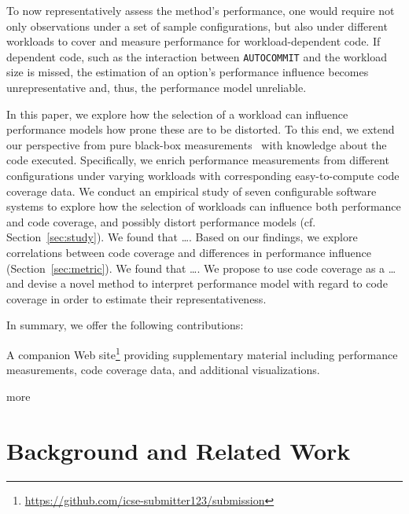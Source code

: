 To now representatively assess the method's performance, one would require not only observations under a set of sample configurations, but also under different workloads to cover and measure performance for workload-dependent code. If dependent code, such as the interaction between \texttt{AUTOCOMMIT} and the workload size is missed, the estimation of an option's performance influence becomes unrepresentative and, thus, the performance model unreliable.

In this paper, we explore how the selection of a workload can influence performance models how prone these are to be distorted. To this end, we extend our perspective from pure black-box measurements~\cite{dorn2020,siegmundPerformanceinfluenceModelsHighly2015,haDeepPerf2019,perfAL,guoVariabilityawarePerformancePrediction2013,sarkarCostEfficientSamplingPerformance,guo_2018_data,fourier_learning_2015,perLasso} with knowledge about the code executed. Specifically, we enrich performance measurements from different configurations under varying workloads with corresponding easy-to-compute code coverage data. 
We conduct an empirical study of seven configurable software systems to explore how the selection of workloads can influence both performance and code coverage, and possibly distort performance models (cf. Section~\ref{sec:study}). {\color{teal}We found that \ldots.} 
Based on our findings, we explore correlations between code coverage and differences in performance influence (Section~\ref{sec:metric}). {\color{teal}	We found that \ldots. We propose to use code coverage as a \ldots and devise a novel method to interpret performance model with regard to code coverage in order to estimate their representativeness.}

In summary, we offer the following contributions:
\begin{compactitem}
	\item A companion Web site\footnote{\url{https://github.com/icse-submitter123/submission}} providing supplementary material including performance measurements, code coverage data, and additional visualizations.
	\item more 
\end{compactitem}

\section{Background and Related Work}
